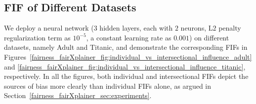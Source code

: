 \subsection{FIF of Different Datasets}
We deploy a neural network ($ 3 $ hidden layers, each with $ 2 $ neurons, L$ 2 $ penalty regularization term as $ 10^{-5} $, a constant learning rate as $ 0.001 $) on different datasets, namely Adult and Titanic, and demonstrate the corresponding FIFs in Figures~\ref{fairness_fairXplainer_fig:individual_vs_intersectional_influence_adult} and \ref{fairness_fairXplainer_fig:individual_vs_intersectional_influence_titanic}, respectively. In all the figures, both individual and intersectional FIFs depict the sources of bias more clearly than individual FIFs alone, as argued in Section~\ref{fairness_fairXplainer_sec:experiments}. 


